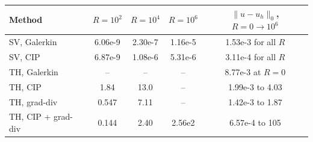 \begin{tabular}{lcccc}
\toprule
Method & $R=10^2$ & $R=10^4$ & $R=10^6$ & $\|u-u_h\|_0$, $R=0\to10^6$ \\
\midrule
SV, Galerkin & 6.06e-9 & 2.30e-7 & 1.16e-5 & 1.53e-3 for all $R$ \\
SV, CIP & 6.87e-9 & 1.08e-6 & 5.31e-6 & 3.11e-4 for all $R$ \\
TH, Galerkin & -- & -- & -- & 8.77e-3 at $R=0$ \\
TH, CIP & 1.84 & 13.0 & -- & 1.99e-3 to 4.03 \\
TH, grad-div & 0.547 & 7.11 & -- & 1.42e-3 to 1.87 \\
TH, CIP + grad-div & 0.144 & 2.40 & 2.56e2 & 6.57e-4 to 105 \\
\bottomrule
\end{tabular}
